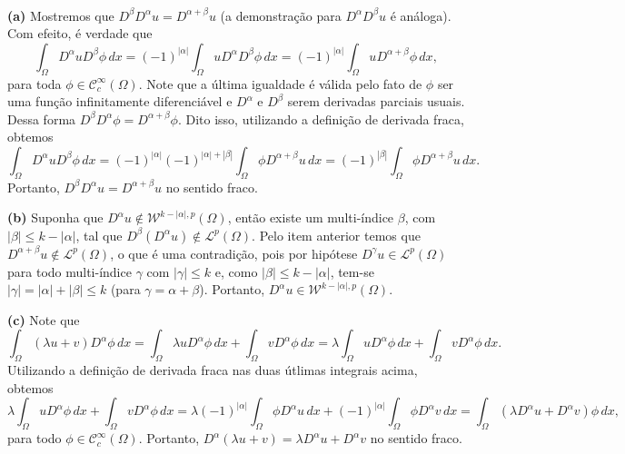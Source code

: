 \documentclass[a4paper, 11pt]{book}
\theoremstyle{definition}
\newcommand{\cC}{\mathcal{C}}
\newcommand{\cL}{\mathcal{L}}
\newcommand{\cW}{\mathcal{W}}
\begin{document}
\begin{prf}
    ~

    \textbf{(a)} Mostremos que $D^{\beta}D^{\alpha} u = D^{\alpha + \beta}u$ (a demonstração para $D^{\alpha}D^{\beta} u$ é análoga).
    Com efeito, é verdade que
    \[
        \int_\Omega D^{\alpha} u D^{\beta} \phi \, dx = (-1)^{|\alpha|} \int_\Omega u D^{\alpha} D^{\beta} \phi \, dx = (-1)^{|\alpha|} \int_\Omega u D^{\alpha + \beta} \phi \,dx,
    \]
    para toda $\phi \in \cC^{\infty}_c(\Omega)$. Note que a última igualdade é válida pelo fato de $\phi$ ser uma função infinitamente diferenciável e $D^\alpha$ e $D^\beta$ serem derivadas parciais usuais.
    Dessa forma $D^{\beta}D^{\alpha} \phi = D^{\alpha + \beta} \phi$.
    Dito isso, utilizando a definição de derivada fraca, obtemos
    \[
        \int_\Omega D^{\alpha} u D^{\beta} \phi \, dx = (-1)^{|\alpha|}(-1)^{|\alpha| + |\beta|} \int_\Omega \phi D^{\alpha+\beta} u \,dx = (-1)^{|\beta|} \int_\Omega \phi D^{\alpha + \beta} u \,dx.
    \]
    Portanto, $D^{\beta} D^{\alpha} u = D^{\alpha + \beta} u$ no sentido fraco.

    \textbf{(b)} Suponha que $D^\alpha u \not\in \cW^{k-|\alpha|,p}(\Omega)$, então existe um multi-índice $\beta$, com $|\beta| \leqslant k - |\alpha|$, tal que $D^{\beta}(D^{\alpha}u) \not\in \cL^p(\Omega)$.
    Pelo item anterior temos que $D^{\alpha+\beta}u \not\in \cL^p(\Omega)$, o que é uma contradição, pois por hipótese $D^{\gamma}u \in \cL^p(\Omega)$ para todo multi-índice $\gamma$ com $|\gamma| \leqslant k$ e, como $|\beta| \leqslant k - |\alpha|$, tem-se $|\gamma| = |\alpha| + |\beta| \leqslant k$ (para $\gamma = \alpha + \beta$).
    Portanto, $D^{\alpha}u \in \cW^{k-|\alpha|,p}(\Omega)$.

    \textbf{(c)} Note que
    \[
        \int_\Omega (\lambda u + v) D^{\alpha}\phi \,dx = \int_\Omega \lambda u D^\alpha \phi \, dx + \int_\Omega v D^\alpha \phi \, dx = \lambda \int_\Omega u D^{\alpha} \phi \,dx + \int_\Omega v D^{\alpha} \phi \, dx.
    \]
    Utilizando a definição de derivada fraca nas duas útlimas integrais acima, obtemos
    {\small
    \[
        \lambda \int_\Omega u D^{\alpha} \phi \,dx + \int_\Omega v D^{\alpha} \phi \, dx = \lambda (-1)^{|\alpha|} \int_\Omega \phi D^{\alpha} u \, dx + (-1)^{|\alpha|}\int_\Omega \phi D^{\alpha} v \, dx = \int_\Omega (\lambda D^{\alpha}u + D^{\alpha}v )\phi \,dx,
    \]}\!
    para todo $\phi \in \cC^{\infty}_c(\Omega)$. Portanto, $D^{\alpha}(\lambda u + v) = \lambda D^\alpha u + D^\alpha v$ no sentido fraco.


\end{prf}
\end{document}
